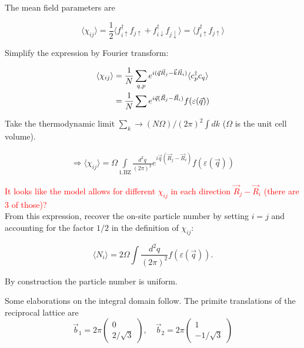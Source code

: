 \documentclass[../../../maim.tex]{subfiles}
\begin{document}
The mean field parameters are

\begin{equation}
	\langle \chi_{ij} \rangle  = \frac{1}{2} \langle f_{i \uparrow}^\dagger f_{j \uparrow} + f_{i \downarrow}^\dagger f_{j \downarrow} \rangle = \langle f_{i \uparrow}^\dagger f_{j \uparrow} \rangle
\end{equation}

Simplify the expression by Fourier transform:

\begin{align}
	\langle \chi_{ij} \rangle &= \frac{1}{N} \sum_{q,p} e^{i(\vec{q}\vec{R}_j - \vec{k}\vec{R}_i)} \langle c_p^\dagger c_q \rangle \notag \\
	&= \frac{1}{N}\sum e^{i\vec{q}(\vec{R}_j-\vec{R}_i)}f(\varepsilon(\vec{q}))
\end{align}

Take the thermodynamic limit $\sum_k \rightarrow (N\Omega)/(2\pi)^2\int dk$ ($\Omega$ is the unit cell volume).

\begin{align}
	\Rightarrow \langle \chi_{ij} \rangle = \Omega\int\limits_{\text{1.BZ}} \frac{d^2q}{(2\pi)^2} e^{i\vec{q}\left(\vec{R}_j - \vec{R}_i\right)}f(\varepsilon(\vec{q})) 
\end{align}

\textcolor{red}{It looks like the model allows for different $\chi_{ij}$ in each direction $\vec{R}_j - \vec{R}_i$ (there are 3 of those)?} \\

From this expression, recover the on-site particle number by setting $i=j$ and accounting for the factor $1/2$ in the definition of $\chi_{ij}$:

\begin{equation}
\langle N_i \rangle = 2\Omega\int \frac{d^2q}{(2\pi)^2} f(\varepsilon(\vec{q})).
\end{equation}

By construction the particle number is uniform. 

Some elaborations on the integral domain follow. The primite translations of the reciprocal lattice are
\begin{equation}
	\vec{b}_1=2\pi
	\begin{pmatrix}
		0 \\
		2/\sqrt{3}
	\end{pmatrix}, \quad
	\vec{b}_2 = 2\pi
	\begin{pmatrix}
		1 \\
		-1/\sqrt{3}
	\end{pmatrix}
\end{equation}
\end{document}
